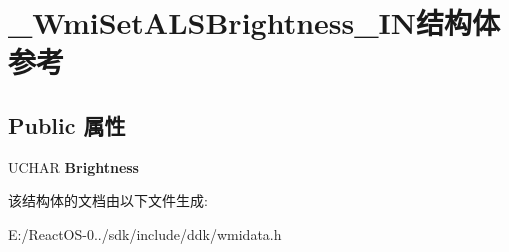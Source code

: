 \hypertarget{struct___wmi_set_a_l_s_brightness___i_n}{}\section{\+\_\+\+Wmi\+Set\+A\+L\+S\+Brightness\+\_\+\+I\+N结构体 参考}
\label{struct___wmi_set_a_l_s_brightness___i_n}
\subsection*{Public 属性}
\begin{DoxyCompactItemize}
\item 
\mbox{\label{struct___wmi_set_a_l_s_brightness___i_n_a30601a240e9504e42bf591d029c1ddc8}} 
U\+C\+H\+AR {\bfseries Brightness}
\end{DoxyCompactItemize}


该结构体的文档由以下文件生成\+:\begin{DoxyCompactItemize}
\item 
E\+:/\+React\+O\+S-\/0../sdk/include/ddk/wmidata.\+h\end{DoxyCompactItemize}

